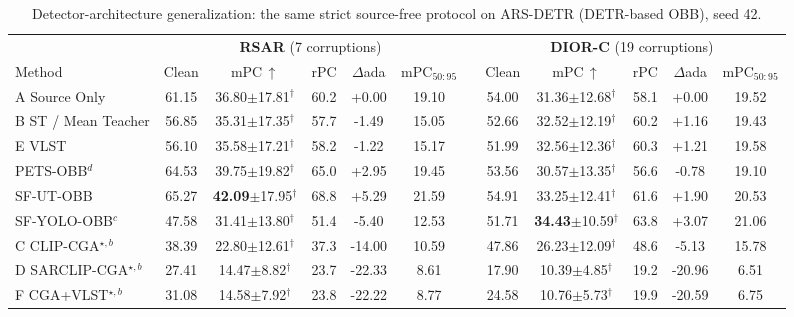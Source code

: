 \begin{table}[t]
\centering
\scriptsize
\setlength{\tabcolsep}{3.2pt}
\renewcommand{\arraystretch}{1.1}
\caption{Detector-architecture generalization: the same strict source-free protocol on ARS-DETR (DETR-based OBB), seed 42.}
\label{tab:detr-obb-sfod}
\begin{tabular}{@{}l ccccc c ccccc@{}}
\toprule
 & \multicolumn{5}{c}{\textbf{RSAR} (7 corruptions)} && \multicolumn{5}{c}{\textbf{DIOR-C} (19 corruptions)} \\
\cmidrule(lr){2-6}\cmidrule(lr){8-12}
Method & Clean & mPC\,$\uparrow$ & rPC & $\Delta$ada & mPC$_{50:95}$ && Clean & mPC\,$\uparrow$ & rPC & $\Delta$ada & mPC$_{50:95}$ \\
\midrule
A Source Only & 61.15 & 36.80{\tiny$\pm$17.81}$^{\dagger}$ & 60.2 & +0.00 & 19.10 &  & 54.00 & 31.36{\tiny$\pm$12.68}$^{\dagger}$ & 58.1 & +0.00 & 19.52 \\
B ST / Mean Teacher & 56.85 & 35.31{\tiny$\pm$17.35}$^{\dagger}$ & 57.7 & -1.49 & 15.05 &  & 52.66 & 32.52{\tiny$\pm$12.19}$^{\dagger}$ & 60.2 & +1.16 & 19.43 \\
E VLST & 56.10 & 35.58{\tiny$\pm$17.21}$^{\dagger}$ & 58.2 & -1.22 & 15.17 &  & 51.99 & 32.56{\tiny$\pm$12.36}$^{\dagger}$ & 60.3 & +1.21 & 19.58 \\
PETS-OBB$^{d}$ & 64.53 & 39.75{\tiny$\pm$19.82}$^{\dagger}$ & 65.0 & +2.95 & 19.45 &  & 53.56 & 30.57{\tiny$\pm$13.35}$^{\dagger}$ & 56.6 & -0.78 & 19.10 \\
SF-UT-OBB & 65.27 & \textbf{42.09}{\tiny$\pm$17.95}$^{\dagger}$ & 68.8 & +5.29 & 21.59 &  & 54.91 & 33.25{\tiny$\pm$12.41}$^{\dagger}$ & 61.6 & +1.90 & 20.53 \\
SF-YOLO-OBB$^{c}$ & 47.58 & 31.41{\tiny$\pm$13.80}$^{\dagger}$ & 51.4 & -5.40 & 12.53 &  & 51.71 & \textbf{34.43}{\tiny$\pm$10.59}$^{\dagger}$ & 63.8 & +3.07 & 21.06 \\
\midrule
C CLIP-CGA$^{\star,b}$ & 38.39 & 22.80{\tiny$\pm$12.61}$^{\dagger}$ & 37.3 & -14.00 & 10.59 &  & 47.86 & 26.23{\tiny$\pm$12.09}$^{\dagger}$ & 48.6 & -5.13 & 15.78 \\
D SARCLIP-CGA$^{\star,b}$ & 27.41 & 14.47{\tiny$\pm$8.82}$^{\dagger}$ & 23.7 & -22.33 & 8.61 &  & 17.90 & 10.39{\tiny$\pm$4.85}$^{\dagger}$ & 19.2 & -20.96 & 6.51 \\
F CGA+VLST$^{\star,b}$ & 31.08 & 14.58{\tiny$\pm$7.92}$^{\dagger}$ & 23.8 & -22.22 & 8.77 &  & 24.58 & 10.76{\tiny$\pm$5.73}$^{\dagger}$ & 19.9 & -20.59 & 6.75 \\

\end{tabular}
\end{table}
